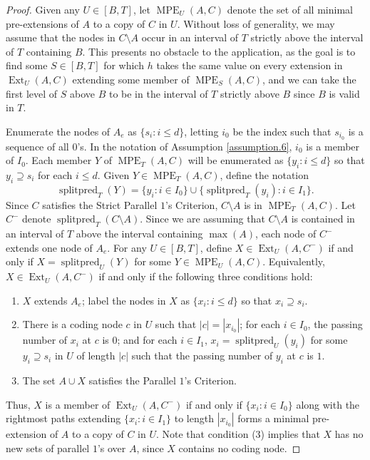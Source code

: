 \documentclass{amsart}
\theoremstyle{remark}
\theoremstyle{definition}
\theoremstyle{remark}
\newcommand{\contains}{\supseteq}
\DeclareMathOperator{\Ext}{Ext}
\DeclareMathOperator{\splitpred}{splitpred}
\DeclareMathOperator{\MPE}{MPE}
\newcommand{\POC}{Parallel $1$'s Criterion}
\newcommand{\SPOC}{Strict Parallel $1$'s Criterion}
\begin{document}
\begin{proof}
Given any $U\in[B,T]$,
let $\MPE_U(A,C)$ denote  the set of all minimal pre-extensions of $A$ to a copy of $C$ in $U$.
Without loss of generality, we may assume that the nodes in $C\setminus A$ occur in an interval of $T$ strictly above the interval of $T$ containing $B$.
This presents no obstacle to the application, as the goal is to find some $S\in[B,T]$ for which $h$ takes the same value on
every extension in $\Ext_U(A,C)$ extending some  member of $\MPE_S(A,C)$,
and we can  take the first level of $S$ above $B$ to  be in the interval of $T$ strictly above $B$ since $B$ is valid in $T$.



Enumerate the nodes of $A_e$ as $\{s_i:i\le d\}$,
letting $i_0$ be the index such that $s_{i_0}$ is a sequence of all $0$'s.
In the notation of Assumption  \ref{assumption.6},
$i_0$ is a member of  $I_0$.
Each member $Y$ of $\MPE_T(A,C)$
will be enumerated as $\{y_i:i\le d\}$ so that $y_i\contains s_i$ for each $i\le d$.
Given   $Y\in\MPE_T(A,C)$,
define the notation
\begin{equation}
\splitpred_T(Y)=\{y_i:i\in I_0\}\cup\{\splitpred_T(y_i):i\in I_1\}.
\end{equation}
Since $C$ satisfies the \SPOC,
$C\setminus A$ is in $\MPE_T(A,C)$.
Let  $C^-$ denote $\splitpred_T(C\setminus A)$.
Since we are assuming that $C\setminus A$ is contained in an interval of $T$ above the interval containing $\max(A)$,
each node of $C^-$ extends one node of $A_e$.
For any $U\in[B,T]$, define $X\in\Ext_{U}(A,C^-)$ if and only if
$X=\splitpred_U(Y)$ for some
$Y\in\MPE_U(A,C)$.
Equivalently,
 $X\in\Ext_{U}(A,C^-)$ if and only if
 the following three conditions hold:
\begin{enumerate}
\item
$X$ extends $A_e$; label the nodes in $X$ as $\{x_i:i\le d\}$ so that  $x_i\contains s_i$.
\item
There is a coding node $c$  in $U$ such that
$|c|=|x_{i_0}|$;
for each $i\in I_0$,
the
passing number of $x_i$ at $c$ is
 $0$;
and for each $i\in I_1$,
$x_i=\splitpred_{U}(y_i)$ for some $y_i\contains s_i$ in $U$ of length $|c|$ such that the
passing number  of $y_i$  at $c$ is $1$.
\item
The set $A\cup  X$ satisfies the \POC.
\end{enumerate}
Thus, $X$ is a member of $\Ext_{U}(A,C^-)$ if and only if
$\{x_i:i\in I_0\}$ along with the rightmost paths extending $\{x_i:i\in I_1\}$ to  length $|x_{i_0}|$ forms a minimal pre-extension of $A$ to a copy of $C$ in $U$.
Note that condition (3) implies that $X$ has no new sets of parallel $1$'s over $A$,
since $X$ contains no coding node.



\end{proof}
\end{document}
